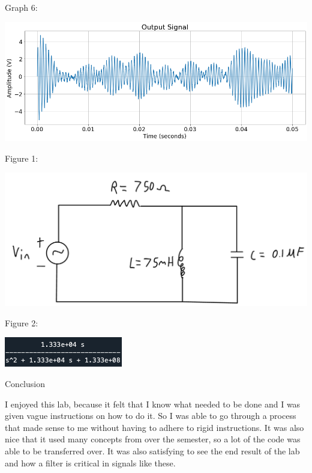\documentclass[nobib]{MSword}
\begin{document}
Graph 6:

\includegraphics[scale = 0.4]
{txt/Lab12Graph6.png}

Figure 1:

\includegraphics[scale = 0.2]
{txt/Lab12Figure1.jpeg}

Figure 2:

\includegraphics[scale = 1]
{txt/Lab12Figure2.png}

\begin{center}
    Conclusion
\end{center}
I enjoyed this lab, because it felt that I know what needed to be done and I was given vague instructions on how to do it. So I was able to go through a process that made sense to me without having to adhere to rigid instructions. It was also nice that it used many concepts from over the semester, so a lot of the code was able to be transferred over. It was also satisfying to see the end result of the lab and how a filter is critical in signals like these.
\end{document}

